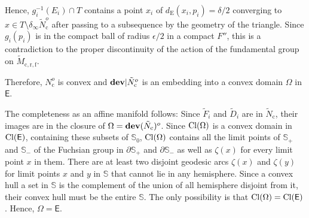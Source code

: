 \documentclass{amsart}
\numberwithin{equation}{section}
\newcommand\dev{{\bf dev}}
\newcommand\clo{{\rm Cl}}
\newcommand\eps{\epsilon}
\newcommand\Ss{{\mathbb{S}}}
\newcommand\Lspace{\mathsf E}
\theoremstyle{definition}
\theoremstyle{remark}
\newcommand{\romec}{\mathrm{c}}
\newcommand{\romecrf}{{\mathrm{c}, \mathrm{r}, \mathrm{f}}}
\begin{document}
Hence, $g_i^{-1}(E_i) \cap T$ contains a point $x_i$ of $d_{\mathrm{E}}(x_i, p_i) =\delta/2$ 
converging to $x \in T \setminus \delta_\infty \tilde N_{\romec} ^o$ after passing to a subsequence 
 by the geometry of the triangle.  
 Since $g_i(p_i)$ is in the compact ball of 
radius $\eps/2$ in a compact $F''$, 
this is a contradiction to the proper discontinuity of the action of the fundamental group
on $\tilde M_{\romecrf}$. 





Therefore, $N_{\romec} ^o$ is convex and $\dev|\tilde N_{\romec} ^o$ is an embedding into 
a convex domain $\Omega$ in $\Lspace$. %

The completeness as an affine manifold follows: 
Since $\tilde F_i$ and $\tilde D_i$ are in 
$\tilde N_{\romec} $, 
their images are in the closure of 
$\Omega= \dev(\tilde N_{\romec} )^o$. 
Since $\clo(\Omega)$ is a convex domain in $\clo(\Lspace)$,
containing these subsets of $\Ss_0$, 
$\clo(\Omega)$ contains all the limit points of $\Ss_+$ and $\Ss_-$ of the Fuchsian group in $\partial \Ss_+$ and $\partial \Ss_-$ as well as 
$\zeta(x)$ for every limit point $x$ in them.
There are at least two disjoint geodesic arcs $\zeta(x)$ and $\zeta(y)$ for limit points $x$ and $y$ in $\Ss$ that cannot lie in 
any hemisphere. 
Since a convex hull a set in $\Ss$ is the complement of the union of all hemisphere disjoint from it, 
their convex hull must be the entire
$\Ss$. 
The only possibility is that $\clo(\Omega) = \clo(\Lspace)$.
Hence, $\Omega =\Lspace$. 
\end{document}
